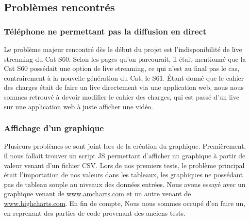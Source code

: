 \documentclass[12pt]{article}
\begin{document}
\subsection{Problèmes rencontrés}
\subsubsection{Téléphone ne permettant pas la diffusion en direct}
Le problème majeur rencontré dès le début du projet est l’indisponibilité de live streaming du Cat S60. Selon les pages qu’on parcourait, il était mentionné que la Cat S60 possédait une option de live streaming, ce qui n’est au final pas le cas, contrairement à la nouvelle génération du Cat, le S61. Étant donné que le cahier des charges était de faire un live directement via une application web, nous nous sommes retrouvé à devoir modifier le cahier des charges, qui est passé d’un live sur une application web à juste afficher une vidéo.
\subsubsection{Affichage d'un graphique}
Plusieurs problèmes se sont joint lors de la création du graphique. Premièrement, il nous fallait trouver un script JS permettant d’afficher un graphique à partir de valeur venant d’un fichier CSV. Lors de nos premiers tests, le problème principal était l’importation de nos valeurs dans les tableaux, les graphiques ne possédant pas de tableau souple au niveaux des données entrées. Nous avons essayé avec un graphique venant de \url{www.amcharts.com} et un autre venant de \url{www.highcharts.com}. En fin de compte, Nous nous sommes occupé d’en faire un, en reprenant des parties de code provenant des anciens tests. 

\clearpage

\listoffigures
\end{document}
